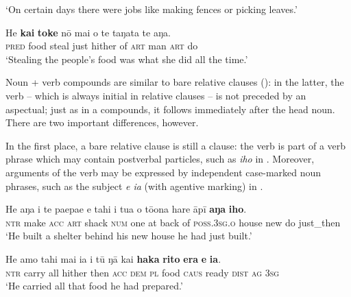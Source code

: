 \glt 
‘On certain days there were jobs like making fences or picking leaves.’ \textstyleExampleref{[R380.084]} 
\z

\ea\label{ex:5.129}
\gll He \textbf{kai} \textbf{toke} nō mai o te taŋata te aŋa. \\
\textsc{pred} food steal just hither of \textsc{art} man \textsc{art} do \\

\glt
‘Stealing the people’s food was what she did all the time.’{\rmfnm} \textstyleExampleref{[R368.017]}  
\z
{}

Noun + verb compounds are similar to bare relative clauses (): in the latter, the verb – which is always initial in relative clauses – is not preceded by an aspectual; just as in a compounds, it follows immediately after the head noun. There are two important differences, however. 

In the first place, a bare relative clause is still a clause: the verb is part of a verb phrase which may contain postverbal particles, such as \textit{iho} in . Moreover, arguments of the verb may be expressed by independent case-marked noun phrases, such as the subject \textit{e ia} (with agentive marking) in . 

\ea\label{ex:5.130}
\gll He aŋa i te paepae e tahi {\ꞌ}i tu{\ꞌ}a o tō{\ꞌ}ona hare {\ꞌ}āpī \textbf{aŋa} \textbf{iho}.\\
\textsc{ntr} make \textsc{acc} \textsc{art} shack \textsc{num} one at back of \textsc{poss.3sg.o} house new do just\_then\\

\glt 
‘He built a shelter behind his new house he had just built.’ \textstyleExampleref{[R250.131]} 
\z

\ea\label{ex:5.131}
\gll He {\ꞌ}amo tahi mai ia i tū ŋā kai \textbf{haka} \textbf{rito} \textbf{era} \textbf{e} \textbf{ia}.\\
\textsc{ntr} carry all hither then \textsc{acc} \textsc{dem} \textsc{pl} food \textsc{caus} ready \textsc{dist} \textsc{ag} \textsc{3sg}\\

\glt
‘He carried all that food he had prepared.’ \textstyleExampleref{[R304.078]} 
\z

